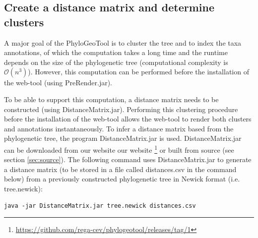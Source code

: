 \documentclass[a4paper, 11pt]{article} %
\begin{document}
\subsection{Create a distance matrix and determine clusters}
A major goal of the PhyloGeoTool is to cluster the tree and to index the taxa annotations, of which the computation takes a long time and the runtime depends on the size of the phylogenetic tree (computational complexity is $\mathcal{O}(n^3)$). 
However, this computation can be performed before the installation of the web-tool (using PreRender.jar).

To be able to support this computation, a distance matrix needs to be constructed (using DistanceMatrix.jar).
Performing this clustering procedure before the installation of the web-tool allows the web-tool to render both clusters and annotations instantaneously.
To infer a distance matrix based from the phylogenetic tree, the program DistanceMatrix.jar is used. DistanceMatrix.jar can be downloaded from our website our website \footnote{\url{https://github.com/rega-cev/phylogeotool/releases/tag/1}} or built from source (see section \ref{sec:source}). 
The following command uses DistanceMatrix.jar to generate a distance matrix (to be stored in a file called distances.csv in the command below) from a previously constructed phylogenetic tree in Newick format (i.e. tree.newick): 
\begin{verbatim}
java -jar DistanceMatrix.jar tree.newick distances.csv
\end{verbatim}
\end{document}
